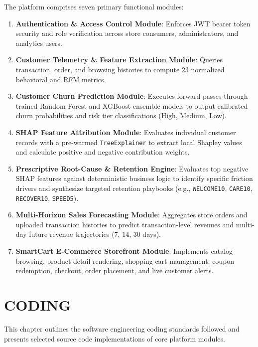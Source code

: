 \documentclass[12pt,a4paper]{article}
\begin{document}
The platform comprises seven primary functional modules:
\begin{enumerate}[leftmargin=20pt]
    \item \textbf{Authentication \& Access Control Module}: Enforces JWT bearer token security and role verification across store consumers, administrators, and analytics users.
    \item \textbf{Customer Telemetry \& Feature Extraction Module}: Queries transaction, order, and browsing histories to compute 23 normalized behavioral and RFM metrics.
    \item \textbf{Customer Churn Prediction Module}: Executes forward passes through trained Random Forest and XGBoost ensemble models to output calibrated churn probabilities and risk tier classifications (High, Medium, Low).
    \item \textbf{SHAP Feature Attribution Module}: Evaluates individual customer records with a pre-warmed \texttt{TreeExplainer} to extract local Shapley values and calculate positive and negative contribution weights.
    \item \textbf{Prescriptive Root-Cause \& Retention Engine}: Evaluates top negative SHAP features against deterministic business logic to identify specific friction drivers and synthesize targeted retention playbooks (e.g., \texttt{WELCOME10}, \texttt{CARE10}, \texttt{RECOVER10}, \texttt{SPEED5}).
    \item \textbf{Multi-Horizon Sales Forecasting Module}: Aggregates store orders and uploaded transaction histories to predict transaction-level revenues and multi-day future revenue trajectories (7, 14, 30 days).
    \item \textbf{SmartCart E-Commerce Storefront Module}: Implements catalog browsing, product detail rendering, shopping cart management, coupon redemption, checkout, order placement, and live customer alerts.
\end{enumerate}

\newpage

\section{CODING}\label{chap:6}

This chapter outlines the software engineering coding standards followed and presents selected source code implementations of core platform modules.
\end{document}
